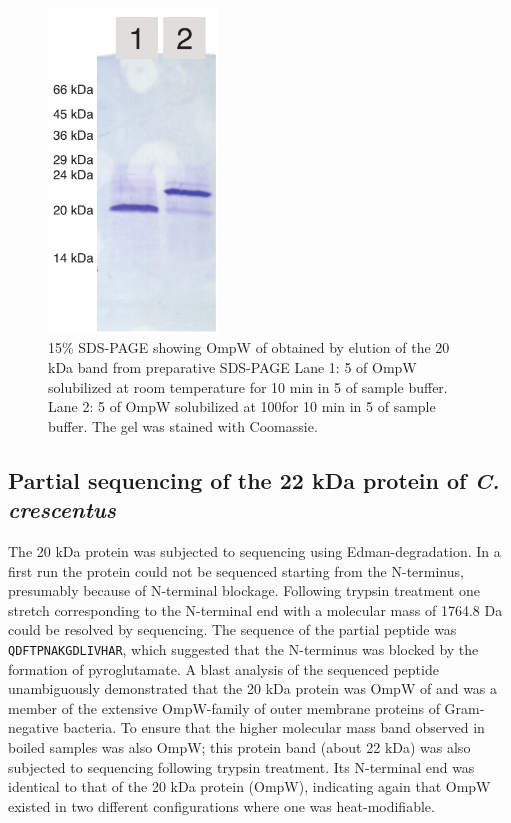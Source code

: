 \begin{figure}[htb]
  	\begin{center}
   		\includegraphics[width=0.4\textwidth]{porin_chapter/img/Fig3-gelpurif.pdf}
   	\end{center}
   	\caption[\ac{SDS-PAGE} showing OmpW from \caulobacter obtained by elution of the 20 kDa band]{
15\% \ac{SDS-PAGE} showing OmpW of \caulobacter obtained by elution of the 20 kDa band from preparative \ac{SDS-PAGE} Lane 1: 5 \microgram of OmpW solubilized at room temperature for 10 min in 5 \microlitre of sample buffer. Lane 2: 5 \microgram of OmpW solubilized at 100\cel for 10 min in 5 \microlitre of sample buffer. The gel was stained with Coomassie.
   	}
   	\label{fig:porin-elutedband}
\end{figure}   

\subsection{Partial sequencing of the 22 kDa protein of \textit{C. crescentus}}
The 20 kDa protein was subjected to sequencing using Edman-degradation. In a first run the protein could not be sequenced starting from the N-terminus, presumably because of N-terminal blockage. Following trypsin treatment one stretch corresponding to the N-terminal end with a molecular mass of 1764.8 Da could be resolved by sequencing. The sequence of the partial peptide was \texttt{QDFTPNAKGDLIVHAR}, which suggested that the N-terminus was blocked by the formation of pyroglutamate. A \ac{blast} analysis of the sequenced peptide unambiguously demonstrated that the 20 kDa protein was OmpW of \caulobacter and was a member of the extensive OmpW-family of outer membrane proteins of Gram-negative bacteria. To ensure that the higher molecular mass band observed in boiled samples was also OmpW; this protein band (about 22 kDa) was also subjected to sequencing following trypsin treatment. Its N-terminal end was identical to that of the 20 kDa protein (OmpW), indicating again that OmpW existed in two different configurations where one was heat-modifiable. 

